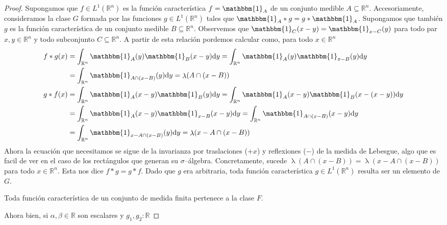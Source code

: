 \documentclass{article}
\newcommand{\characteristic}{\mathbbm{1}}
\newcommand{\realNumbers}{\mathbb{R}}
\DeclareMathOperator{\lebesgueMeasure}{\lambda}
\theoremstyle{remark}
\begin{document}
\begin{proof}
    Supongamos que \(f \in L^1(\realNumbers^n)\) es la función característica \(f = \characteristic_A\) de un conjunto medible \(A \subseteq \realNumbers^n\).
    Accesoriamente, consideramos la clase \(G\) formada por las funciones \(g \in L^1(\realNumbers^n)\) tales que \(\characteristic_A * g = g * \characteristic_A\).
    Supongamos que también \(g\) es la función característica de un conjunto medible \(B \subseteq \realNumbers^n\).
    Observemos que \(\characteristic_C (x - y) = \characteristic_{x - C} (y)\) para todo par \(x, y \in \realNumbers^n\) y todo subconjunto \(C \subseteq \realNumbers^n\).
    A partir de esta relación pordemos calcular como, para todo \(x \in \realNumbers^n\)
    \begin{align}
      f * g (x)
      &=
      \int_{\realNumbers^n} \characteristic_A(y) \characteristic_B(x - y) \dd y
      =
      \int_{\realNumbers^n} \characteristic_A(y) \characteristic_{x - B} (y) \dd y
      \\
      &=
      \int_{\realNumbers^n} \characteristic_{A \cap (x - B)}(y) \dd y
      =
      \lebesgueMeasure(A \cap (x - B))
      \\
      g * f(x)
      &=
      \int_{\realNumbers^n} \characteristic_A(x - y) \characteristic_B(y) \dd y
      =
      \int_{\realNumbers^n} \characteristic_A(x - y) \characteristic_B(x - (x - y)) \dd y
      \\
      &=
      \int_{\realNumbers^n} \characteristic_A(x - y) \characteristic_{x - B} (x - y) \dd y
      =
      \int_{\realNumbers^n} \characteristic_{A \cap (x - B)}(x - y) \dd y
      \\
      &=
      \int_{\realNumbers^n} \characteristic_{x - A \cap (x - B)}(y) \dd y
      =
      \lebesgueMeasure(x - A \cap (x - B))
    \end{align}
    Ahora la ecuación que necesitamos se sigue de la invarianza por traslaciones (\(+ x\)) y reflexiones (\(-\)) de la medida de Lebesgue, algo que es facil de ver en el caso de los rectángulos que generan su \(\sigma\)--álgebra.
    Concretamente, sucede
    \(
      \lebesgueMeasure(A \cap (x - B))
      =
      \lebesgueMeasure(x - A \cap (x - B))
    \)
    para todo \(x \in \realNumbers^n\).
    Esta nos dice \(f * g = g * f\).
    Dado que \(g\) era arbitraria, toda función característica \(g \in L^1(\realNumbers^n)\) resulta ser un elemento de \(G\).

    Toda función característica de un conjunto de medida finita pertenece a la clase \(F\).

    Ahora bien, si \(\alpha, \beta \in \realNumbers\) son escalares y \(g_1, g_2 : \realNumbers\)
     
  \end{proof}
\end{document}
